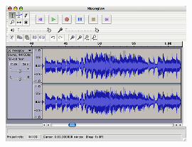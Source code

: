 \begin{frame}
\begin{columns}[t]
\begin{column}{0.5\textwidth}
      \begin{figure}[!h]
        \begin{center}
          \includegraphics[width = 0.60\textwidth]{presentation/outils2.png}
        \end{center}
      \end{figure}
    \end{column}
    
  \end{columns}
  
\end{frame}



